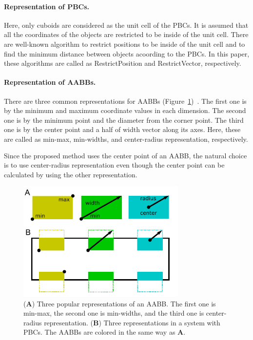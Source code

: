 \documentclass[10pt,letterpaper,twocolumn]{article}
\begin{document}
\paragraph{Representation of PBCs.}
Here, only cuboids are considered as the unit cell of the PBCs.
It is assumed that all the coordinates of the objects are restricted to be
inside of the unit cell.
There are well-known algorithm to restrict positions to be inside of the unit
cell and to find the minimum distance between objects acoording to the PBCs.
In this paper, these algorithms are called as RestrictPosition and
RestrictVector, respectively.

\paragraph{Representation of AABBs.}
There are three common representations for AABBs
(Figure~\ref{fig-rectangle-rep})~\cite{real-time-collision-detection}.
The first one is by the minimum and maximum coordinate values in each dimension.
The second one is by the minimum point and the diameter from the corner point.
The third one is by the center point and a half of width vector along its axes.
Here, these are called as min-max, min-widths, and center-radius representation,
respectively.

Since the proposed method uses the center point of an AABB, the natural choice
is to use center-radius representation even though the center point can be
calculated by using the other representation.

\begin{figure}[thb]
    \includegraphics[width=8.4cm, bb=2 6 226 165]{fig-rect-rep.eps}
    \caption{
    (\textbf{A})
    Three popular representations of an AABB. The first one is min-max,
    the second one is min-widths, and the third one is center-radius representation.
    (\textbf{B})
    Three representations in a system with PBCs.
    The AABBs are colored in the same way as \textbf{A}.
    }
    \label{fig-rectangle-rep}
\end{figure}
\end{document}
